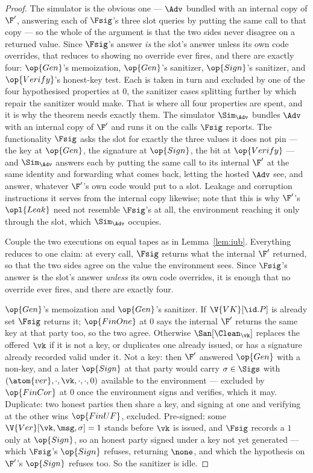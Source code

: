 \documentclass[10pt,oneside,openany]{book}
\theoremstyle{accentdef}
\theoremstyle{accentplain}
\begin{document}
\begin{proof}
The simulator is the obvious one --- $\Adv$ bundled with an internal copy of $\F'$, answering each
of $\Fsig$'s three slot queries by putting the same call to that copy --- so the whole of the
argument is that the two sides never disagree on a returned value. Since $\Fsig$'s answer \emph{is}
the slot's answer unless its own code overrides, that reduces to showing no override ever fires,
and there are exactly four: $\op{Gen}$'s memoization, $\op{Gen}$'s sanitizer, $\op{Sign}$'s
sanitizer, and $\op{Verify}$'s honest-key test. Each is taken in turn and excluded by one of the
four hypothesised properties at $0$, the sanitizer cases splitting further by which repair the
sanitizer would make. That is where all four properties are spent, and it is why the theorem needs
exactly them.
The simulator $\Sim_{\Adv}$ bundles $\Adv$ with an internal copy of $\F'$ and runs it on the calls $\Fsig$
reports. The functionality $\Fsig$ asks the slot for exactly the three values it does not pin --- the key at
$\op{Gen}$, the signature at $\op{Sign}$, the bit at $\op{Verify}$ --- and $\Sim_{\Adv}$ answers
each by putting the same call to its internal $\F'$ at the same identity and forwarding what comes
back, letting the hosted $\Adv$ see, and answer, whatever $\F'$'s own code would put to a slot.
Leakage and corruption instructions it serves from the internal copy likewise; note that this is
why $\F'$'s $\opl{Leak}$ need not resemble $\Fsig$'s at all, the environment reaching it only
through the slot, which $\Sim_{\Adv}$ occupies.

Couple the two executions on equal tapes as in Lemma~\ref{lem:iub}. Everything reduces to one
claim: at every call, $\Fsig$ returns what the internal $\F'$ returned, so that the two sides
agree on the value the environment sees. Since $\Fsig$'s answer is the slot's answer \emph{unless}
its own code overrides, it is enough that no override ever fires, and there are exactly four.

$\op{Gen}$'s memoization and $\op{Gen}$'s sanitizer. If $\V{VK}[\id.P]$ is already set $\Fsig$
returns it; $\op{FinOne}$ at $0$ says the internal $\F'$ returns the same key at that party too,
so the two agree. Otherwise $\San[\Clean_{\vk}]$ replaces the offered $\vk$ if it is not a key, or
duplicates one already issued, or has a signature already recorded valid under it. Not a key: then
$\F'$ answered $\op{Gen}$ with a non-key, and a later $\op{Sign}$ at that party would carry
$\sigma \in \Sigs$ with $(\atom{ver},\cdot,\vk,\cdot,\cdot,0)$ available to the environment ---
excluded by $\op{FinCor}$ at $0$ once the environment signs and verifies, which it may. Duplicate:
two honest parties then share a key, and signing at one and verifying at the other wins
$\op{FinUF}$, excluded. Pre-signed: some $\V{Ver}[\vk,\msg,\sigma] = 1$ stands before $\vk$ is
issued, and $\Fsig$ records a $1$ only at $\op{Sign}$, so an honest party signed under a key not
yet generated --- which $\Fsig$'s $\op{Sign}$ refuses, returning $\none$, and which the
hypothesis on $\F'$'s $\op{Sign}$ refuses too. So the sanitizer is idle.


\end{proof}
\end{document}
